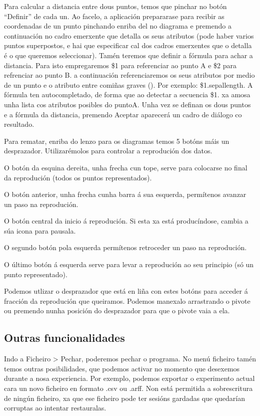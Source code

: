 Para calcular a distancia entre dous puntos, temos que pinchar no botón ``Definir'' de cada un. Ao facelo, a aplicación prepararase para recibir as coordenadas de un punto pinchando enriba del no diagrama e premendo a continuación no cadro emerxente que detalla os seus atributos (pode haber varios puntos superpostos, e hai que especificar cal dos cadros emerxentes que o detalla é o que queremos seleccionar). Tamén teremos que definir a fórmula para achar a distancia. Para isto empregaremos \$1 para referenciar ao punto A e \$2 para refrenciar ao punto B. a continuación referenciaremos os seus atributos por medio de un punto e o atributo entre comiñas graves (\grave{}). Por exemplo: \$1.\grave{}sepallength\grave{}. A fórmula ten autocompletado, de forma que ao detectar a secuencia \$1. xa amosa unha lista cos atributos posibles do puntoA. Unha vez se definan os dous puntos e a fórmula da distancia, premendo Aceptar aparecerá un cadro de diálogo co resultado.

Para rematar, enriba do lenzo para os diagramas temos 5 botóns máis un desprazador. Utilizarémolos para controlar a reprodución dos datos.

O botón da esquina dereita, unha frecha cun tope, serve para colocarse no final da reprodución (todos os puntos representados).

O botón anterior, unha frecha cunha barra á sua esquerda, permítenos avanzar un paso na reprodución.

O botón central da inicio á reprodución. Si esta xa está producíndose, cambia a súa icona para pausala.

O segundo botón pola esquerda permítenos retroceder un paso na reprodución.

O último botón á esquerda serve para levar a reprodución ao seu principio (só un punto representado).

Podemos utlizar o desprazador que está en liña con estes botóns para acceder á fracción da reprodución que queiramos. Podemos manexalo arrastrando o pivote ou premendo nunha posición do desprazador para que o pivote vaia a ela.

\subsection{Outras funcionalidades}

Indo a Ficheiro \textgreater{} Pechar, poderemos pechar o programa. No menú ficheiro tamén temos outras posibilidades, que podemos activar no momento que desexemos durante a nosa experiencia. Por exemplo, podemos exportar o experimento actual cara un novo ficheiro en formato .csv ou .arff. Non está permitida a sobrescritura de ningún ficheiro, xa que ese ficheiro pode ter sesións gardadas que quedarían corruptas ao intentar restauralas.

